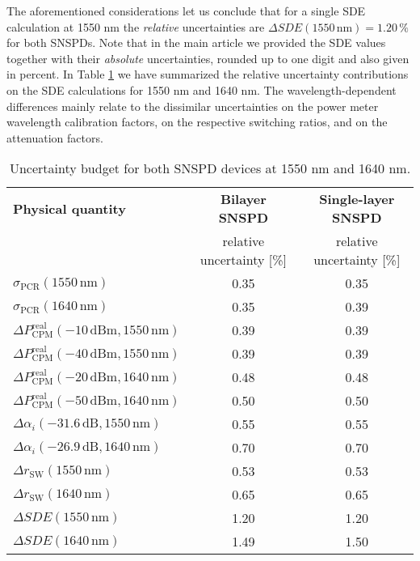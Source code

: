 \documentclass[aip,apl,showpacs,showkeys,preprint,superscriptaddress,preprintnumbers,amsmath,amssymb]{revtex4-1}
\begin{document}
\begin{bibunit}
The aforementioned considerations let us conclude that for a single SDE calculation at 1550 nm the \textit{relative} uncertainties are $\Delta SDE\left(1550\,\mathrm{nm}\right)=1.20\,\%$ for both SNSPDs. Note that in the main article we provided the SDE values together with their \textit{absolute} uncertainties, rounded up to one digit and also given in percent. In Table \ref{tab:s01} we have summarized the relative uncertainty contributions on the SDE calculations for 1550 nm and 1640 nm. The wavelength-dependent differences mainly relate to the dissimilar uncertainties on the power meter wavelength calibration factors, on the respective switching ratios, and on the attenuation factors.



\begin{table}[h]
\caption{\label{tab:s01} Uncertainty budget for both SNSPD devices at 1550 nm and 1640 nm.}
\begin{ruledtabular}
\begin{tabular}{lcc}
\textbf{Physical quantity} & \textbf{Bilayer SNSPD} & \textbf{Single-layer SNSPD}\\
& relative uncertainty [\%] & relative uncertainty [\%]\\\hline\hline
$\sigma_\mathrm{PCR} (1550\,\mathrm{nm})$ & 0.35 & 0.35\\
$\sigma_\mathrm{PCR} (1640\,\mathrm{nm})$ & 0.35 & 0.39\\\hline
$\Delta P^\mathrm{real}_\mathrm{CPM}(-10\,\mathrm{dBm},1550\,\mathrm{nm})$ & 0.39 & 0.39\\
$\Delta P^\mathrm{real}_\mathrm{CPM}(-40\,\mathrm{dBm},1550\,\mathrm{nm})$ & 0.39 & 0.39\\
$\Delta P^\mathrm{real}_\mathrm{CPM}(-20\,\mathrm{dBm},1640\,\mathrm{nm})$ & 0.48 & 0.48\\
$\Delta P^\mathrm{real}_\mathrm{CPM}(-50\,\mathrm{dBm},1640\,\mathrm{nm})$ & 0.50 & 0.50\\\hline
$\Delta \alpha_i(-31.6\,\mathrm{dB}, 1550\,\mathrm{nm})$ & 0.55 & 0.55\\
$\Delta \alpha_i(-26.9\,\mathrm{dB}, 1640\,\mathrm{nm})$ & 0.70 & 0.70\\\hline
$\Delta r_\mathrm{SW}(1550\,\mathrm{nm})$ & 0.53 &0.53\\
$\Delta r_\mathrm{SW}(1640\,\mathrm{nm})$ & 0.65 & 0.65\\\hline\hline
$\Delta SDE(1550\,\mathrm{nm})$ & 1.20 & 1.20\\
$\Delta SDE(1640\,\mathrm{nm})$ & 1.49 & 1.50\\
\end{tabular}
\end{ruledtabular}
\end{table}

\putbib
\end{bibunit}
\end{document}
